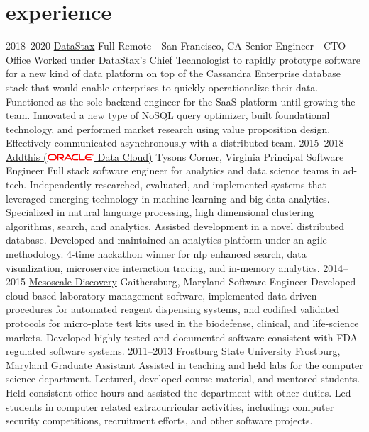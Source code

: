 \documentclass[]{friggeri-cv} %
\begin{document}
\section{experience}
\begin{entrylist}
\entry
{2018--2020}
{\href{https://www.datastax.com/}{DataStax}}
{Full Remote - San Francisco, CA}
{Senior Engineer - CTO Office}
{
	Worked under DataStax's Chief Technologist to rapidly prototype software for a new kind of data platform on top of the Cassandra Enterprise database stack that would enable enterprises to quickly operationalize their data. Functioned as the sole backend engineer for the SaaS platform until growing the team. Innovated a new type of NoSQL query optimizer, built foundational technology, and performed market research using value proposition design. Effectively communicated asynchronously with a distributed team.
}
\entry
{2015--2018}
{\href{https://www.addthis.com/}{Addthis (\includegraphics[width=50pt]{500px-Oracle_logo.svg.png}  Data Cloud)}}
{Tysons Corner, Virginia}
{Principal Software Engineer}
{
	Full stack software engineer for analytics and data science teams in ad-tech. Independently researched, evaluated, and implemented systems that leveraged emerging technology in machine learning and big data analytics. Specialized in natural language processing, high dimensional clustering algorithms, search, and analytics. Assisted development in a novel distributed database. Developed and maintained an analytics platform under an agile methodology. 4-time hackathon winner for nlp enhanced search, data visualization, microservice interaction tracing, and in-memory analytics.
}
\entry
{2014--2015}
{\href{https://www.mesoscale.com/}{Mesoscale Discovery}}
{Gaithersburg, Maryland}
{Software Engineer}
{
	Developed cloud-based laboratory management software, implemented data-driven procedures for automated reagent dispensing systems, and codified validated protocols for micro-plate test kits used in the biodefense, clinical, and life-science markets. Developed highly tested and documented software consistent with FDA regulated software systems.
}
\entry
{2011--2013}
{\href{http://www.frostburg.edu/}{Frostburg State University}}
{Frostburg, Maryland}
{Graduate Assistant}
{
	Assisted in teaching and held labs for the computer science department. Lectured, developed course material, and mentored students. Held consistent office hours and assisted the department with other duties. Led students in computer related extracurricular activities, including: computer security competitions, recruitment efforts, and other software projects.
}
\end{entrylist}
\end{document}
